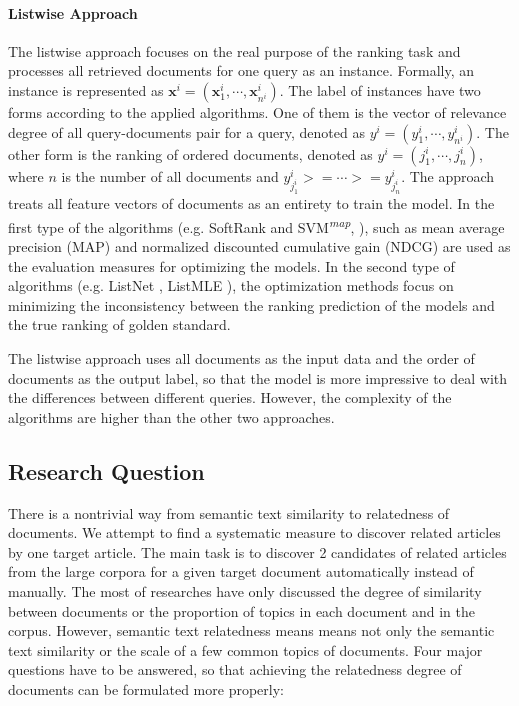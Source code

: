\paragraph{Listwise Approach}

The listwise approach focuses on the real purpose of the ranking task and processes all retrieved documents for one query as an instance. Formally, an instance is represented as $\mathbf{x}^i = (\mathbf{x}_1^i, \cdots, \mathbf{x}_{n^i}^i)$. The label of instances have two forms according to the applied algorithms. One of them is the vector of relevance degree of all query-documents pair for a query, denoted as $y^i=(y_1^i, \cdots, y_{n^i}^i)$. The other form is the ranking of ordered documents, denoted as $y^i=(j_1^i, \cdots, j_{n}^i)$, where $n$ is the number of all documents and $y_{j_1^i}^i >= \cdots >= y_{j_n^i}^i$. The approach treats all feature vectors of documents as an entirety to train the model. In the first type of the algorithms (e.g. SoftRank \citep{taylor2008softrank} and SVM\textsuperscript{\textit{map}},  \citep{yu2005svm}), such as mean average precision (MAP) and normalized discounted cumulative gain (NDCG) are used as the evaluation measures for optimizing the models. In the second type of algorithms (e.g. ListNet \citep{cao2007learning}, ListMLE \citep{xia2008listwise}), the optimization methods focus on minimizing the inconsistency between the ranking prediction of the models and the true ranking of golden standard. 

The listwise approach uses all documents as the input data and the order of documents as the output label, so that the model is more impressive to deal with the differences between different queries. However, the complexity of the algorithms are higher than the other two approaches. 

\bigbreak

\subsection{Research Question}
\label{sec:2.5}

There is a nontrivial way from semantic text similarity to relatedness of documents. We attempt to find a systematic measure to discover related articles by one target article. The main task is to discover 2 candidates of related articles from the large corpora for a given target document automatically instead of manually. The most of researches have only discussed the degree of similarity between documents or the proportion of topics in each document and in the corpus. However, semantic text relatedness means means not only the semantic text similarity or the scale of a few common topics of documents. Four major questions have to be answered, so that achieving the relatedness degree of documents can be formulated more properly: 

